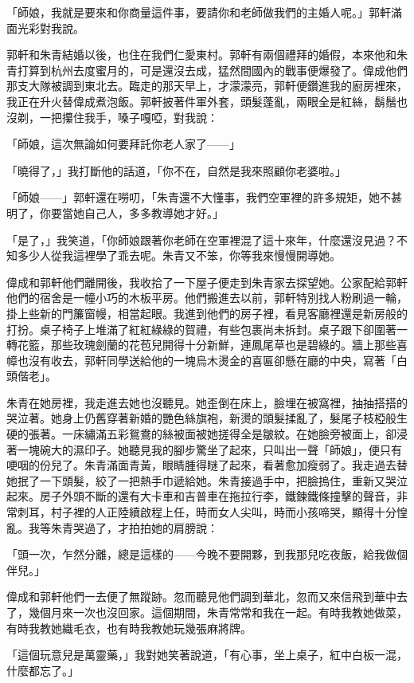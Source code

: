 「師娘，我就是要來和你商量這件事，要請你和老師做我們的主婚人呢。」郭軒滿面光彩對我說。

郭軒和朱青結婚以後，也住在我們仁愛東村。郭軒有兩個禮拜的婚假，本來他和朱青打算到杭州去度蜜月的，可是還沒去成，猛然間國內的戰事便爆發了。偉成他們那支大隊被調到東北去。臨走的那天早上，才濛濛亮，郭軒便鑽進我的廚房裡來，我正在升火替偉成煮泡飯。郭軒披著件軍外套，頭髮蓬亂，兩眼全是紅絲，鬍鬚也沒剃，一把攥住我手，嗓子嘎啞，對我說：

「師娘，這次無論如何要拜託你老人家了——」

「曉得了，」我打斷他的話道，「你不在，自然是我來照顧你老婆啦。」

「師娘——」郭軒還在嘮叨，「朱青還不大懂事，我們空軍裡的許多規矩，她不甚明了，你要當她自己人，多多教導她才好。」

「是了，」我笑道，「你師娘跟著你老師在空軍裡混了這十來年，什麼還沒見過？不知多少人從我這裡學了乖去呢。朱青又不笨，你等我來慢慢開導她。


偉成和郭軒他們離開後，我收拾了一下屋子便走到朱青家去探望她。公家配給郭軒他們的宿舍是一幢小巧的木板平房。他們搬進去以前，郭軒特別找人粉刷過一輪，掛上些新的門簾窗幔，相當起眼。我進到他們的房子裡，看見客廳裡還是新房般的打扮。桌子椅子上堆滿了紅紅綠綠的賀禮，有些包裹尚未拆封。桌子跟下卻圍著一轉花籃，那些玫瑰劍蘭的花苞兒開得十分新鮮，連鳳尾草也是碧綠的。牆上那些喜幛也沒有收去，郭軒同學送給他的一塊烏木燙金的喜匾卻懸在廳的中央，寫著「白頭偕老」。

朱青在她房裡，我走進去她也沒聽見。她歪倒在床上，臉埋在被窩裡，抽抽搭搭的哭泣著。她身上仍舊穿著新婚的艷色絲旗袍，新燙的頭髮揉亂了，髮尾子枝椏般生硬的張著。一床繡滿五彩鴛鴦的絲被面被她搓得全是皺紋。在她臉旁被面上，卻浸著一塊碗大的濕印子。她聽見我的腳步驚坐了起來，只叫出一聲「師娘」，便只有哽咽的份兒了。朱青滿面青黃，眼睛腫得瞇了起來，看著愈加瘦弱了。我走過去替她抿了一下頭髮，絞了一把熱手巾遞給她。朱青接過手中，把臉摀住，重新又哭泣起來。房子外頭不斷的還有大卡車和吉普車在拖拉行李，鐵鍊鐵條撞擊的聲音，非常刺耳，村子裡的人正陸續啟程上任，時而女人尖叫，時而小孩啼哭，顯得十分惶亂。我等朱青哭過了，才拍拍她的肩膀說：

「頭一次，乍然分離，總是這樣的——今晚不要開夥，到我那兒吃夜飯，給我做個伴兒。」

偉成和郭軒他們一去便了無蹤跡。忽而聽見他們調到華北，忽而又來信飛到華中去了，幾個月來一次也沒回家。這個期間，朱青常常和我在一起。有時我教她做菜，有時我教她織毛衣，也有時我教她玩幾張麻將牌。

「這個玩意兒是萬靈藥，」我對她笑著說道，「有心事，坐上桌子，紅中白板一混，什麼都忘了。」

